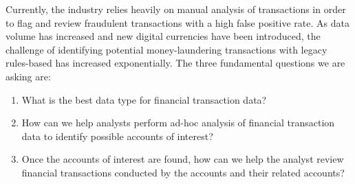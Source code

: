 \textnormal{Currently, the industry relies heavily on manual analysis of transactions in order to flag and review fraudulent transactions with a high false positive rate. As data volume has increased and new digital currencies have been introduced, the challenge of identifying potential money-laundering transactions with legacy rules-based has increased exponentially. The three fundamental questions we are asking are:}

\begin{enumerate}
\item{
What is the best data type for financial transaction data?}
\item{
How can we help analysts perform ad-hoc analysis of financial transaction data to identify possible accounts of interest?}
\item{
Once the accounts of interest are found, how can we help the analyst review financial transactions conducted by the accounts and their related accounts?}

\end{enumerate}